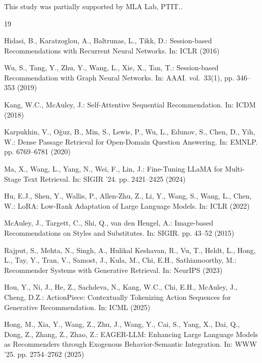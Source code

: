 \documentclass[runningheads]{llncs}
\begin{document}
%
\begin{credits}
\subsubsection{\ackname}
This study was partially supported by MLA Lab, PTIT..

\end{credits}
%
%
\begin{thebibliography}{19}

Hidasi, B., Karatzoglou, A., Baltrunas, L., Tikk, D.: Session-based Recommendations with Recurrent
Neural Networks. In: ICLR (2016)

Wu, S., Tang, Y., Zhu, Y., Wang, L., Xie, X., Tan, T.: Session-based Recommendation with Graph
Neural Networks. In: AAAI. vol.~33(1), pp. 346--353 (2019)

Kang, W.C., McAuley, J.: Self-Attentive Sequential Recommendation. In: ICDM (2018)

Karpukhin, V., O\u{g}uz, B., Min, S., Lewis, P., Wu, L., Edunov, S., Chen, D., Yih, W.: Dense
Passage Retrieval for Open-Domain Question Answering. In: EMNLP. pp. 6769--6781 (2020)

Ma, X., Wang, L., Yang, N., Wei, F., Lin, J.: Fine-Tuning LLaMA for Multi-Stage Text Retrieval. In:
SIGIR '24. pp. 2421--2425 (2024)

Hu, E.J., Shen, Y., Wallis, P., Allen-Zhu, Z., Li, Y., Wang, S., Wang, L., Chen, W.: LoRA:
Low-Rank Adaptation of Large Language Models. In: ICLR (2022)

McAuley, J., Targett, C., Shi, Q., van den Hengel, A.: Image-based Recommendations on Styles and
Substitutes. In: SIGIR. pp. 43--52 (2015)

Rajput, S., Mehta, N., Singh, A., Hulikal Keshavan, R., Vu, T., Heldt, L., Hong, L., Tay, Y., Tran,
V., Samost, J., Kula, M., Chi, E.H., Sathiamoorthy, M.: Recommender Systems with Generative
Retrieval. In: NeurIPS (2023)

Hou, Y., Ni, J., He, Z., Sachdeva, N., Kang, W.C., Chi, E.H., McAuley, J., Cheng, D.Z.:
ActionPiece: Contextually Tokenizing Action Sequences for Generative Recommendation. In: ICML
(2025)

Hong, M., Xia, Y., Wang, Z., Zhu, J., Wang, Y., Cai, S., Yang, X., Dai, Q., Dong, Z., Zhang, Z.,
Zhao, Z.: EAGER-LLM: Enhancing Large Language Models as Recommenders through Exogenous
Behavior-Semantic Integration. In: WWW '25. pp. 2754--2762 (2025)


\end{thebibliography}
\end{document}
